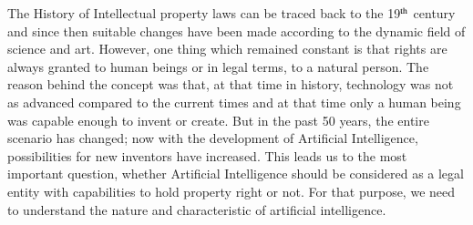 \begin{multicols}{2}

\noi
The History of Intellectual property laws can be traced back to the 19$^{\rm th}$ century and since
then suitable changes have been made according to the dynamic field of science and art.
However, one thing which remained constant is that rights are always granted to human
beings or in legal terms, to a natural person. The reason behind the concept was that, at that
time in history, technology was not as advanced compared to the current times and at that
time only a human being was capable enough to invent or create. But in the past 50 years,
the entire scenario has changed; now with the development of Artificial Intelligence,
possibilities for new inventors have increased. This leads us to the most important question,
whether Artificial Intelligence should be considered as a legal entity with capabilities to hold
property right or not. For that purpose, we need to understand the nature and characteristic
of artificial intelligence. 


\end{multicols}
